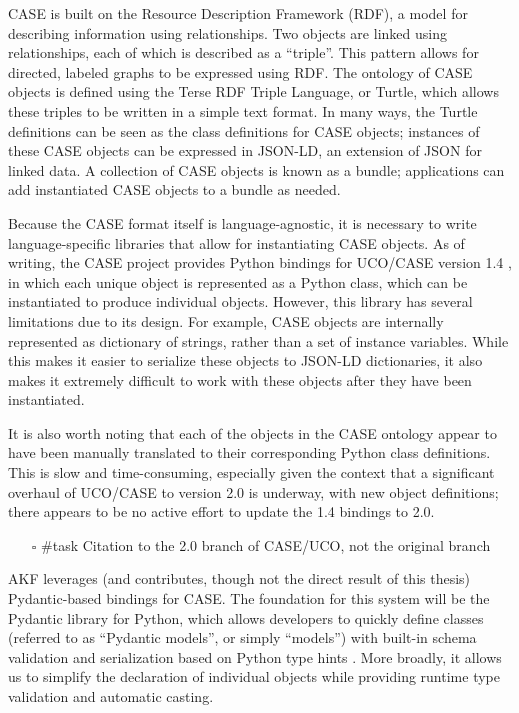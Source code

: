 \documentclass[letterpaper,12pt]{report}
\def\tightlist{}
\begin{document}
CASE is built on the Resource Description Framework (RDF), a model for
describing information using relationships. Two objects are linked using
relationships, each of which is described as a ``triple''. This pattern
allows for directed, labeled graphs to be expressed using RDF. The
ontology of CASE objects is defined using the Terse RDF Triple Language,
or Turtle, which allows these triples to be written in a simple text
format. In many ways, the Turtle definitions can be seen as the class
definitions for CASE objects; instances of these CASE objects can be
expressed in JSON-LD, an extension of JSON for linked data. A collection
of CASE objects is known as a bundle; applications can add instantiated
CASE objects to a bundle as needed.

Because the CASE format itself is language-agnostic, it is necessary to
write language-specific libraries that allow for instantiating CASE
objects. As of writing, the CASE project provides Python bindings for
UCO/CASE version 1.4 \cite{CaseworkCASEMappingPython}, in which each
unique object is represented as a Python class, which can be
instantiated to produce individual objects. However, this library has
several limitations due to its design. For example, CASE objects are
internally represented as dictionary of strings, rather than a set of
instance variables. While this makes it easier to serialize these
objects to JSON-LD dictionaries, it also makes it extremely difficult to
work with these objects after they have been instantiated.

It is also worth noting that each of the objects in the CASE ontology
appear to have been manually translated to their corresponding Python
class definitions. This is slow and time-consuming, especially given the
context that a significant overhaul of UCO/CASE to version 2.0 is
underway, with new object definitions; there appears to be no active
effort to update the 1.4 bindings to 2.0.

\begin{itemize}
\tightlist
\item[$\square$]
  \#task Citation to the 2.0 branch of CASE/UCO, not the original branch
\end{itemize}

AKF leverages (and contributes, though not the direct result of this
thesis) Pydantic-based bindings for CASE. The foundation for this system
will be the Pydantic library for Python, which allows developers to
quickly define classes (referred to as ``Pydantic models'', or simply
``models'') with built-in schema validation and serialization based on
Python type hints \cite{colvinPydantic2024}. More broadly, it allows
us to simplify the declaration of individual objects while providing
runtime type validation and automatic casting.
\end{document}
